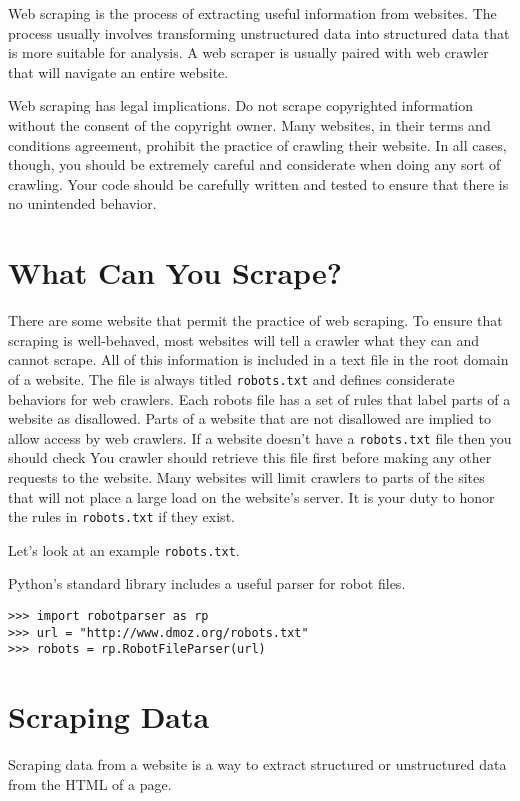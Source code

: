 
Web scraping is the process of extracting useful information from websites.
The process usually involves transforming unstructured data into structured data that is more suitable for analysis.
A web scraper is usually paired with web crawler that will navigate an entire website.

\begin{warn}
Web scraping has legal implications.
Do not scrape copyrighted information without the consent of the copyright owner.
Many websites, in their terms and conditions agreement, prohibit the practice of crawling their website.
In all cases, though, you should be extremely careful and considerate when doing any sort of crawling.
Your code should be carefully written and tested to ensure that there is no unintended behavior.
\end{warn}

\section*{What Can You Scrape?}
There are some website that permit the practice of web scraping.
To ensure that scraping is well-behaved, most websites will tell a crawler what they can and cannot scrape.
All of this information is included in a text file in the root domain of a website.
The file is always titled \texttt{robots.txt} and defines considerate behaviors for web crawlers.
Each robots file has a set of rules that label parts of a website as disallowed.
Parts of a website that are not disallowed are implied to allow access by web crawlers.
If a website doesn't have a \texttt{robots.txt} file then you should check
You crawler should retrieve this file first before making any other requests to the website.
Many websites will limit crawlers to parts of the sites that will not place a large load on the website's server.
It is your duty to honor the rules in \texttt{robots.txt} if they exist.

Let's look at an example \texttt{robots.txt}.

Python's standard library includes a useful parser for robot files.
\begin{lstlisting}
>>> import robotparser as rp
>>> url = "http://www.dmoz.org/robots.txt"
>>> robots = rp.RobotFileParser(url)
\end{lstlisting}



\section*{Scraping Data}
Scraping data from a website is a way to extract structured or unstructured data from the HTML of a page.

